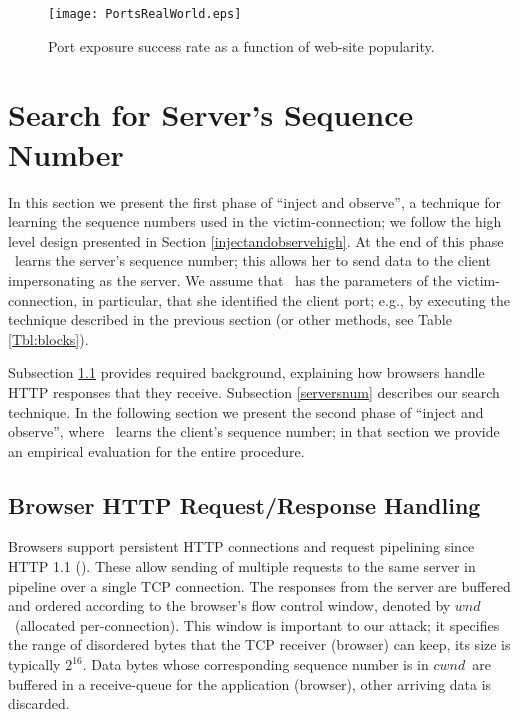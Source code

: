 \documentclass[conference]{IEEEtran}
\newcommand{\wnd}{$\textit{wnd}$}
\newcommand{\cwnd}{$\textit{cwnd}$}
\begin{document}
{\begin{figure}
  \begin{center}
    \texttt{[image: PortsRealWorld.eps]}
  \end{center}
  \caption{Port exposure success rate as a function of web-site popularity.}
    \label{fig:portexposurereal}
\end{figure}
}



\section{Search for Server's Sequence Number} \label{serverseq}

In this section we present the first phase of ``inject and observe'', a technique for learning the sequence numbers used in the victim-connection; we follow the high level design presented in Section \ref{injectandobservehigh}. At the end of this phase \mal\ learns the server's sequence number; this allows her to send data to the client impersonating as the server. We assume that \mal\ has the parameters of the victim-connection, in particular, that she identified the client port; e.g., by executing the technique described in the previous section (or other methods, see Table \ref{Tbl:blocks}). 


 Subsection \ref{http} provides required background, explaining how browsers handle HTTP responses that they receive. Subsection \ref{serversnum} describes our search technique. In the following section we present the second phase of ``inject and observe'', where \mal\ learns the client's sequence number; in that section we provide an empirical evaluation for the entire procedure.

\subsection{Browser HTTP Request/Response Handling} \label{http}

Browsers support persistent HTTP connections and request pipelining since HTTP 1.1 (\cite{rfc2616}). These allow sending of multiple requests to the same server in pipeline over a single TCP connection. The responses from the server are buffered and ordered according to the browser's flow control window, denoted by \wnd\ (allocated per-connection). This window is important to our attack; it specifies the range of disordered bytes that the TCP receiver (browser) can keep, its size is typically $2^{16}$. Data bytes whose corresponding sequence number is in \cwnd\ are buffered in a receive-queue for the application (browser), other arriving data is discarded.
\end{document}
